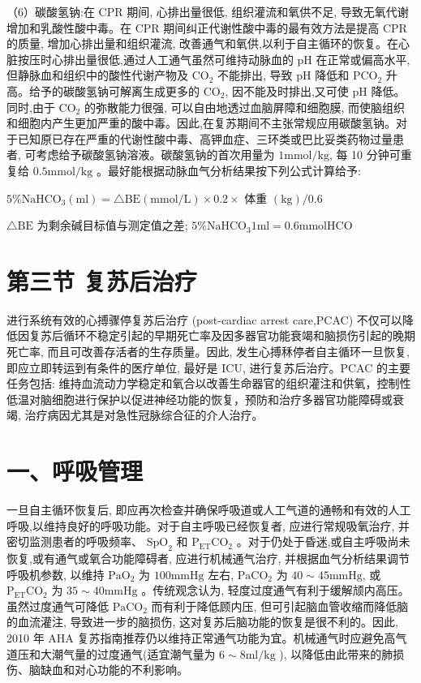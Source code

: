 \documentclass[10pt]{article}
\begin{document}
（6）碳酸氢钠:在 CPR 期间, 心排出量很低, 组织灌流和氧供不足, 导致无氧代谢增加和乳酸性酸中毒。在 CPR 期间纠正代谢性酸中毒的最有效方法是提高 CPR 的质量, 增加心排出量和组织灌流, 改善通气和氧供,以利于自主循环的恢复。在心脏按压时心排出量很低,通过人工通气虽然可维持动脉血的 $\mathrm{pH}$ 在正常或偏高水平,但静脉血和组织中的酸性代谢产物及 $\mathrm{CO}_{2}$ 不能排出, 导致 $\mathrm{pH}$ 降低和 $\mathrm{PCO}_{2}$ 升高。给予的碳酸氢钠可解离生成更多的 $\mathrm{CO}_{2}$, 因不能及时排出,又可使 $\mathrm{pH}$ 降低。同时,由于 $\mathrm{CO}_{2}$ 的弥散能力很强, 可以自由地透过血脑屏障和细胞膜, 而使脑组织和细胞内产生更加严重的酸中毒。因此,在复苏期间不主张常规应用碳酸氢钠。对于已知原已存在严重的代谢性酸中毒、高钾血症、三环类或巴比妥类药物过量患者, 可考虑给予碳酸氢钠溶液。碳酸氢钠的首次用量为 $1 \mathrm{mmol} / \mathrm{kg}$, 每 10 分钟可重复给 $0.5 \mathrm{mmol} / \mathrm{kg}$ 。最好能根据动脉血气分析结果按下列公式计算给予:

$5 \% \mathrm{NaHCO}_{3}(\mathrm{ml})=\triangle \mathrm{BE}(\mathrm{mmol} / \mathrm{L}) \times 0.2 \times$ 体重 $(\mathrm{kg}) / 0.6$

$\triangle \mathrm{BE}$ 为剩余碱目标值与测定值之差; $5 \% \mathrm{NaHCO}_{3} 1 \mathrm{ml}=0.6 \mathrm{mmol} \mathrm{HCO}$

\section*{第三节 复苏后治疗}
进行系统有效的心搏骤停复苏后治疗 (post-cardiac arrest care,PCAC) 不仅可以降低因复苏后循环不稳定引起的早期死亡率及因多器官功能衰竭和脑损伤引起的晚期死亡率, 而且可改善存活者的生存质量。因此, 发生心搏秝停者自主循环一旦恢复, 即应立即转运到有条件的医疗单位, 最好是 ICU, 进行复苏后治疗。PCAC 的主要任务包括: 维持血流动力学稳定和氧合以改善生命器官的组织灌注和供氧，控制性低温对脑细胞进行保护以促进神经功能的恢复，预防和治疗多器官功能障碍或衰竭, 治疗病因尤其是对急性冠脉综合征的介人治疗。

\section*{一、呼吸管理}
一旦自主循环恢复后, 即应再次检查并确保呼吸道或人工气道的通畅和有效的人工呼吸,以维持良好的呼吸功能。对于自主呼吸已经恢复者, 应进行常规吸氧治疗, 并密切监测患者的呼吸频率、 $\mathrm{SpO}_{2}$ 和 $\mathrm{P}_{\mathrm{ET}} \mathrm{CO}_{2}$ 。对于仍处于昏迷,或自主呼吸尚未恢复,或有通气或氧合功能障碍者, 应进行机械通气治疗, 并根据血气分析结果调节呼吸机参数, 以维持 $\mathrm{PaO}_{2}$ 为 $100 \mathrm{mmHg}$ 左右, $\mathrm{PaCO}_{2}$ 为 $40 \sim 45 \mathrm{mmHg}$, 或 $\mathrm{P}_{\mathrm{ET}} \mathrm{CO}_{2}$ 为 $35 \sim 40 \mathrm{mmHg}$ 。传统观念认为, 轻度过度通气有利于缓解颃内高压。虽然过度通气可降低 $\mathrm{PaCO}_{2}$ 而有利于降低顾内压, 但可引起脑血管收缩而降低脑的血流灌注, 导致进一步的脑损伤, 这对复苏后脑功能的恢复是很不利的。因此, 2010 年 AHA 复苏指南推荐仍以维持正常通气功能为宜。机械通气时应避免高气道压和大潮气量的过度通气(适宜潮气量为 $6 \sim 8 \mathrm{ml} / \mathrm{kg}$ ), 以降低由此带来的肺损伤、脑缺血和对心功能的不利影响。
\end{document}
